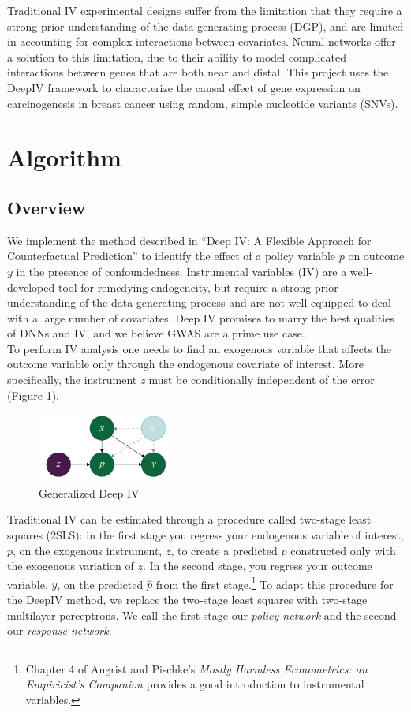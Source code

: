 \documentclass[10.5pt, oneside, twocolumn]{article}   	%
\begin{document}
Traditional IV experimental designs suffer from the limitation that they require a strong prior understanding of the data generating process (DGP), and are limited in accounting for complex interactions between covariates. Neural networks offer a solution to this limitation, due to their ability to model complicated interactions between genes that are both near and distal.\cite{cheng2011recurrent} This project uses the DeepIV framework  to characterize the causal effect of gene expression on carcinogenesis in breast cancer using random, simple nucleotide variants (SNVs). 

\section{Algorithm}
\subsection{Overview}
We implement the method described in ``Deep IV: A Flexible Approach for Counterfactual Prediction'' to identify the effect of a policy variable $p$ on outcome $y$ in the presence of confoundedness.\cite{hartford2017deep} Instrumental variables (IV) are a well-developed tool for remedying endogeneity, but require a strong prior understanding of the data generating process and are not well equipped to deal with a large number of covariates. Deep IV promises to marry the best qualities of DNNs and IV, and we believe GWAS are a prime use case. \\

To perform IV analysis one needs to find an exogenous variable that affects the outcome variable only through the endogenous covariate of interest. More specifically, the instrument \emph{z} must be conditionally independent of the error (Figure 1).\\

\begin{figure}[h]
	\caption{Generalized Deep IV}
	\centering
	\includegraphics[width=0.4\textwidth]{Figure_1.png}
\end{figure}

Traditional IV can be estimated through a procedure called two-stage least squares (2SLS): in the first stage you regress your endogenous variable of interest, $p$, on the exogenous instrument, $z$, to create a predicted $\hat{p}$ constructed only with the exogenous variation of $z$. In the second stage, you regress your outcome variable, $y$, on the predicted $\hat{p}$ from the first stage.\footnote{Chapter 4 of Angrist and Pischke's \emph{Mostly Harmless Econometrics: an Empiricist's Companion}\cite{angrist2008mostly} provides a good introduction to instrumental variables.} To adapt this procedure for the DeepIV method, we replace the two-stage least squares with two-stage multilayer perceptrons. We call the first stage our \emph{policy network} and the second our \emph{response network}.\\
\end{document}
